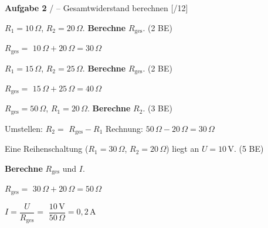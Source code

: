\documentclass[11pt, a4paper]{article}
\newif\ifzeigesternchen
\newcommand{\lsg}[1]{\textcolor{loesung}{\textbf{#1}}}
\newcommand{\punktebox}[1]{\hfill\small\textcolor{mittelgrau}{[\hspace{0.8em}/#1]}}
\newcommand{\stern}[1]{\ifzeigesternchen\textsuperscript{\textcolor{fachfarbe}{(#1)}}\fi}
\newcommand{\aufgabe}[2]{%
    \needspace{4\baselineskip}%
    \vspace{8pt}%
    \noindent\textbf{\textcolor{fachfarbe}{Aufgabe #1}} #2%
    \vspace{4pt}%
    \nopagebreak[4]%
}
\newcommand{\operator}[1]{\textbf{#1}}
\begin{document}

\aufgabe{2}{\stern{*}/\stern{**} – Gesamtwiderstand berechnen} \punktebox{12}

\begin{teil}
    \item \stern{*} $R_1 = 10\,\Omega$, $R_2 = 20\,\Omega$. \operator{Berechne} $R_{\text{ges}}$. \hfill (2 BE)

    \vspace{0.3em}
    $R_{\text{ges}} = $ \lsg{$10\,\Omega + 20\,\Omega = 30\,\Omega$}

    \vspace{0.5em}
    \item \stern{*} $R_1 = 15\,\Omega$, $R_2 = 25\,\Omega$. \operator{Berechne} $R_{\text{ges}}$. \hfill (2 BE)

    \vspace{0.3em}
    $R_{\text{ges}} = $ \lsg{$15\,\Omega + 25\,\Omega = 40\,\Omega$}

    \vspace{0.5em}
    \item \stern{**} $R_{\text{ges}} = 50\,\Omega$, $R_1 = 20\,\Omega$. \operator{Berechne} $R_2$. \hfill (3 BE)

    \vspace{0.3em}
    Umstellen: $R_2 = $ \lsg{$R_{\text{ges}} - R_1$} \hspace{0.5cm} Rechnung: \lsg{$50\,\Omega - 20\,\Omega = 30\,\Omega$}

    \vspace{0.5em}
    \item \stern{**} Eine Reihenschaltung ($R_1 = 30\,\Omega$, $R_2 = 20\,\Omega$) liegt an $U = 10\,\text{V}$. \hfill (5 BE)

    \operator{Berechne} $R_{\text{ges}}$ und $I$.

    \vspace{0.3em}
    $R_{\text{ges}} = $ \lsg{$30\,\Omega + 20\,\Omega = 50\,\Omega$}

    \vspace{0.3em}
    $I = \dfrac{U}{R_{\text{ges}}} = $ \lsg{$\dfrac{10\,\text{V}}{50\,\Omega} = 0{,}2\,\text{A}$}
\end{teil}

\end{document}
